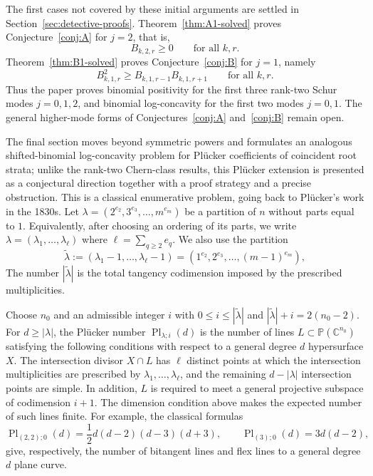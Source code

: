 \documentclass[11pt]{amsart}
\numberwithin{equation}{section}
\theoremstyle{remark}
\DeclareMathOperator{\Pl}{Pl}
\begin{document}
The first cases not covered by these initial arguments are settled in
Section~\ref{sec:detective-proofs}.  Theorem~\ref{thm:A1-solved} proves
Conjecture~\ref{conj:A} for $j=2$, that is,
\[
  B_{k,2,r}\ge0
  \qquad\text{for all }k,r.
\]
Theorem~\ref{thm:B1-solved} proves Conjecture~\ref{conj:B} for $j=1$,
namely
\[
  B_{k,1,r}^2\ge B_{k,1,r-1}B_{k,1,r+1}
  \qquad\text{for all }k,r.
\]
Thus the paper proves binomial positivity for the first three rank-two
Schur modes $j=0,1,2$, and binomial log-concavity for the first two modes
$j=0,1$.  The general higher-mode forms of
Conjectures~\ref{conj:A} and~\ref{conj:B} remain open.

The final section moves beyond symmetric powers and formulates an analogous shifted-binomial log-concavity problem for Pl\"ucker coefficients of coincident root strata; unlike the rank-two Chern-class results, this Pl\"ucker extension is presented as a conjectural direction together with a proof strategy and a precise obstruction. This is a
classical enumerative problem, going back to Pl\"ucker's work in the
1830s. Let $\lambda=(2^{e_2},3^{e_3},\ldots,m^{e_m})$
be a partition of $n$ without parts equal to $1$.  Equivalently, after choosing
an ordering of its parts, we write $\lambda=(\lambda_1,\ldots,\lambda_\ell)$ where $\ell=\sum_{q\ge2}e_q$.  
We also use the partition
\[
  \tilde\lambda
  :=
  (\lambda_1-1,\ldots,\lambda_\ell-1)
  =
  (1^{e_2},2^{e_3},\ldots,(m-1)^{e_m}),
\]
The number $|\tilde\lambda|$ is the total tangency codimension imposed by the prescribed multiplicities.

Choose $n_0$ and an admissible integer $i$ with
$0\le i\le |\tilde\lambda|$ and $|\tilde\lambda|+i=2(n_0-2)$.
For $d\ge |\lambda|$, the Pl\"ucker number
$\Pl_{\lambda;i}(d)$ is the number of lines
$L\subset \mathbb P(\mathbb C^{n_0})$ satisfying the following conditions
with respect to a general degree $d$ hypersurface $X$.  The intersection
divisor $X\cap L$ has $\ell$ distinct points at which the intersection
multiplicities are prescribed by
$\lambda_1,\ldots,\lambda_\ell$, and the remaining $d-|\lambda|$
intersection points are simple.  In addition, $L$ is required to meet a
general projective subspace of codimension $i+1$.  The dimension condition
above makes the expected number of such lines finite.
For example, the classical formulas
\[
  \Pl_{(2,2);0}(d)
  =
  \frac12 d(d-2)(d-3)(d+3),
  \qquad
  \Pl_{(3);0}(d)
  =
  3d(d-2),
\]
give, respectively, the number of bitangent lines and flex lines to a
general degree $d$ plane curve.
\end{document}
